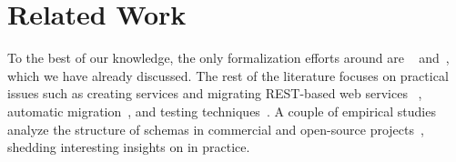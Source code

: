 \section{Related Work}\label{sec:related}

To the best of our knowledge, the only formalization efforts around \gql are \HP~\cite{gqlph} and~\cite{olafschema}, which we have already discussed. The rest of the \gql literature focuses on practical issues such as creating \gql services and migrating REST-based web services \gql~\cite{improvingoeeu, ehriapi, gqlexperiences}, automatic migration~\cite{migratingapi}, and testing techniques~\cite{gqldeviation}. A couple of empirical studies analyze the structure of \gql schemas in commercial and open-source projects~\cite{empiricalgql, empiricalapi}, shedding interesting insights on \gql in practice.


